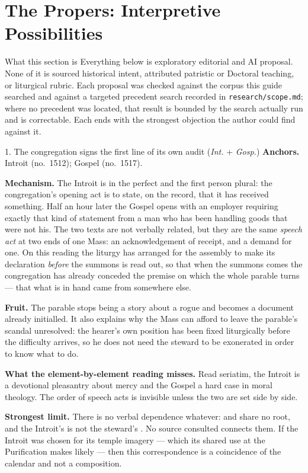 \section{The Propers: Interpretive Possibilities}

\begin{studybox}{What this section is}
Everything below is exploratory editorial and AI proposal. None of it is
sourced historical intent, attributed patristic or Doctoral teaching, or
liturgical rubric. Each proposal was checked against the corpus this guide
searched and against a targeted precedent search recorded in
\texttt{research/scope.md}; where no precedent was located, that result is
bounded by the search actually run and is correctable. Each ends with the
strongest objection the author could find against it.
\end{studybox}

\begin{proposal}{1. The congregation signs the first line of its own audit
\normalfont(\emph{Int.} + \emph{Gosp.})}
\textbf{Anchors.} Introit 
(no.\ 1512); Gospel  (no.\ 1517).

\textbf{Mechanism.} The Introit is in the perfect and the first person plural:
the congregation's opening act is to state, on the record, that it has received
something. Half an hour later the Gospel opens with an employer requiring
exactly that kind of statement from a man who has been handling goods that were
not his. The two texts are not verbally related, but they are the same
\emph{speech act} at two ends of one Mass: an acknowledgement of receipt, and a
demand for one. On this reading the liturgy has arranged for the assembly to
make its declaration \emph{before} the summons is read out, so that when the
summons comes the congregation has already conceded the premise on which the
whole parable turns --- that what is in hand came from somewhere else.

\textbf{Fruit.} The parable stops being a story about a rogue and becomes a
document already initialled. It also explains why the Mass can afford to leave
the parable's scandal unresolved: the hearer's own position has been fixed
liturgically before the difficulty arrives, so he does not need the steward to
be exonerated in order to know what to do.

\textbf{What the element-by-element reading misses.} Read seriatim, the Introit
is a devotional pleasantry about mercy and the Gospel a hard case in moral
theology. The order of speech acts is invisible unless the two are set side by
side.

\textbf{Strongest limit.} There is no verbal dependence whatever: 
and  share no root, and the Introit's  is not
the steward's . No source consulted connects them. If the Introit was
chosen for its temple imagery --- which its shared use at the Purification makes
likely --- then this correspondence is a coincidence of the calendar and not a
composition.
\end{proposal}

